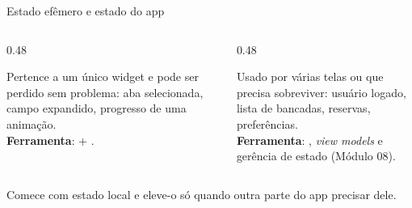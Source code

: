 \documentclass[aspectratio=169,10pt]{beamer}
\begin{document}
\begin{frame}{Estado efêmero e estado do app}
  \begin{columns}[T]
    \begin{column}{0.48\textwidth}
      \begin{conceito}
        Pertence a um único widget e pode ser perdido sem problema: aba selecionada, campo expandido, progresso de uma animação.\\[2pt]
        \textbf{Ferramenta}:  + .
      \end{conceito}
    \end{column}
    \begin{column}{0.48\textwidth}
      \begin{conceito}
        Usado por várias telas ou que precisa sobreviver: usuário logado, lista de bancadas, reservas, preferências.\\[2pt]
        \textbf{Ferramenta}: , \emph{view models} e gerência de estado (Módulo 08).
      \end{conceito}
    \end{column}
  \end{columns}
  \vspace{4pt}
  \begin{center}
  \end{center}
  \begin{dica}
    Comece com estado local e eleve-o só quando outra parte do app precisar dele.
  \end{dica}
\end{frame}
\end{document}
